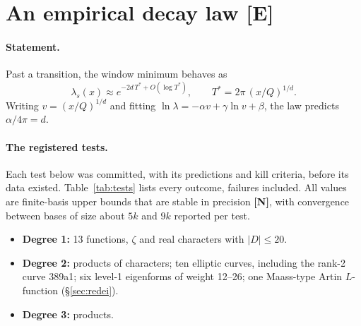 \documentclass[11pt]{article}
\theoremstyle{remark}
\newcommand{\tagE}{\textbf{[E]}}
\newcommand{\tagN}{\textbf{[N]}}
\begin{document}
\section{An empirical decay law \tagE}\label{sec:decay}

\paragraph{Statement.} Past a transition, the window minimum behaves as
\[
\lambda_s(x)\approx e^{-2d\,T^*+O(\log T^*)},\qquad T^*=2\pi\,(x/Q)^{1/d}.
\]
Writing $v=(x/Q)^{1/d}$ and fitting $\ln\lambda=-\alpha v+\gamma\ln v+\beta$, the law predicts $\alpha/4\pi=d$.

\paragraph{The registered tests.} Each test below was committed, with its predictions and kill criteria, before its data existed. Table~\ref{tab:tests} lists every outcome, failures included. All values are finite-basis upper bounds that are stable in precision \tagN, with convergence between bases of size about $5k$ and $9k$ reported per test.
\begin{itemize}
\item \textbf{Degree 1:} 13 functions, $\zeta$ and real characters with $|D|\le20$.
\item \textbf{Degree 2:} products of characters; ten elliptic curves, including the rank-2 curve 389a1; six level-1 eigenforms of weight 12--26; one Maass-type Artin $L$-function (\S\ref{sec:redei}).
\item \textbf{Degree 3:} products.
\end{itemize}
\end{document}
